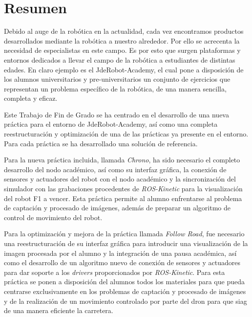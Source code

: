 \chapter*{Resumen}
\setlength{\parskip}{1ex}

Debido al auge de la robótica en la actualidad, cada vez encontramos productos desarrollados mediante la robótica a nuestro alrededor. Por ello se acrecenta la necesidad de especialistas en este campo. Es por esto que surgen plataformas y entornos dedicados a llevar el campo de la robótica a estudiantes de distintas edades. En claro ejemplo es el JdeRobot-Academy, el cual pone a disposición de los alumnos universitarios y pre-universitarios un conjunto de ejercicios que representan un problema específico de la robótica, de una manera sencilla, completa y eficaz.

Este Trabajo de Fin de Grado se ha centrado en el desarrollo de una nueva práctica para el entorno de JdeRobot-Academy, así como una completa reestructuración y optimización de una de las prácticas ya presente en el entorno. Para cada práctica se ha desarrollado una solución de referencia.

Para la nueva práctica incluida, llamada \textit{Chrono}, ha sido necesario el completo desarrollo del nodo académico, así como su interfaz gráfica, la conexión de sensores y actuadores del robot con el nodo académico y la sincronización del simulador con las grabaciones procedentes de \textit{ROS-Kinetic} para la visualización del robot F1 a vencer.
Esta práctica permite al alumno enfrentarse al problema de captación y procesado de imágenes, además de preparar un algoritmo de control de movimiento del robot.

Para la optimización y mejora de la práctica llamada \textit{Follow Road}, fue necesario una reestructuración de su interfaz gráfica para introducir una visualización de la imagen procesada por el alumno y la integración de una pausa académica, así como el desarrollo de un algoritmo nuevo de conexión de sensores y actuadores para dar soporte a los \textit{drivers} proporcionados por \textit{ROS-Kinetic}.
Para esta práctica se ponen a disposición del alumnos todos los materiales para que pueda centrarse exclusivamente en los problemas de captación y procesado de imágenes y de la realización de un movimiento controlado por parte del dron para que siag de una manera eficiente la carretera.